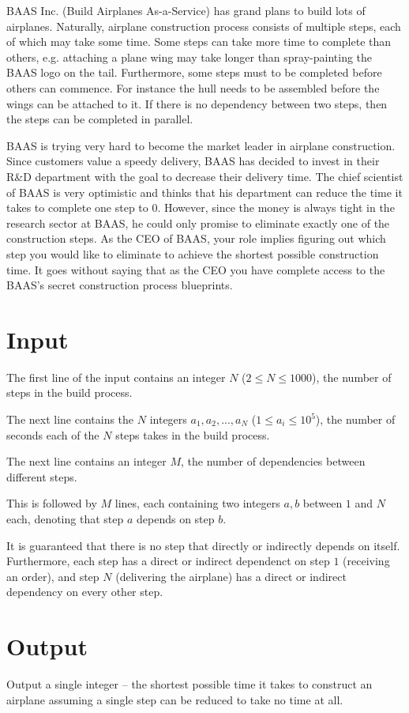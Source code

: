 BAAS Inc. (Build Airplanes As-a-Service) has grand plans to build lots of airplanes.
Naturally, airplane construction process consists of multiple steps, each of which may take some time.
Some steps can take more time to complete than others, e.g. attaching a plane wing may take longer than spray-painting the BAAS logo on the tail.
Furthermore, some steps must to be completed before others can commence.
For instance the hull needs to be assembled before the wings can be attached to it.
If there is no dependency between two steps, then the steps can be completed in parallel.

BAAS is trying very hard to become the market leader in airplane construction.
Since customers value a speedy delivery, BAAS has decided to invest in their R\&D department with the goal to decrease their delivery time.
The chief scientist of BAAS is very optimistic and thinks that his department can reduce the time it takes to complete one step to 0.
However, since the money is always tight in the research sector at BAAS, he could only promise to eliminate exactly one of the construction steps.
As the CEO of BAAS, your role implies figuring out which step you would like to eliminate to achieve the shortest possible construction time.
It goes without saying that as the CEO you have complete access to the BAAS's secret construction process blueprints.

\section*{Input}
The first line of the input contains an integer $N$ ($2 \le N \le 1000$), the number of steps in the build process.

The next line contains the $N$ integers $a_1, a_2, ..., a_N$ ($1 \le a_i \le 10^5$), the number of seconds each of the $N$ steps takes in the build process.

The next line contains an integer $M$, the number of dependencies between different steps.

This is followed by $M$ lines, each containing two integers $a, b$ between $1$ and $N$ each, denoting that step $a$ depends on step $b$.

It is guaranteed that there is no step that directly or indirectly depends on itself.
Furthermore, each step has a direct or indirect dependenct on step $1$ (receiving an order), and step $N$ (delivering the airplane) has a direct or indirect dependency on every other step.

\section*{Output}
Output a single integer -- the shortest possible time it takes to construct an airplane assuming a single step can be reduced to take no time at all.
